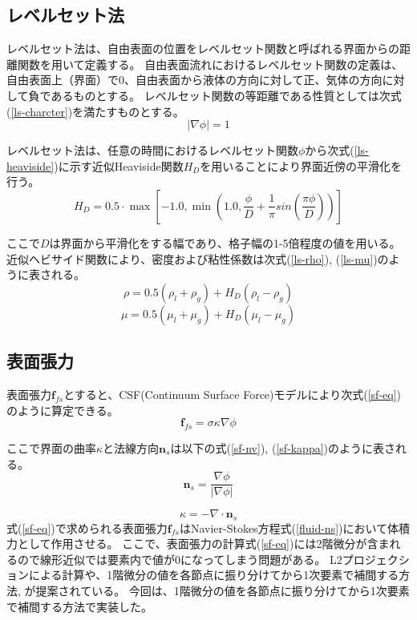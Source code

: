 \subsection{レベルセット法}
レベルセット法は、自由表面の位置をレベルセット関数と呼ばれる界面からの距離関数を用いて定義する。
自由表面流れにおけるレベルセット関数の定義は、自由表面上（界面）で0、自由表面から液体の方向に対して正、気体の方向に対して負であるものとする。
レベルセット関数の等距離である性質としては次式(\ref{ls-charcter})を満たすものとする。
\begin{equation}
\label{ls-charcter}
	| \nabla \phi | = 1
\end{equation}

レベルセット法は、任意の時間におけるレベルセット関数$\phi$から次式(\ref{ls-heaviside})に示す近似Heaviside関数$H_{D}$を用いることにより界面近傍の平滑化を行う。
\begin{equation}
\label{ls-heaviside}
	H_{D} = 0.5 \cdot \max \left[-1.0, \min \left(1.0, \frac{\phi}{D} + \frac{1}{\pi} sin\left(\frac{\pi \phi}{D}\right)\right) \right]
\end{equation}

ここで$D$は界面から平滑化をする幅であり、格子幅の1-5倍程度の値を用いる。
近似ヘビサイド関数により、密度および粘性係数は次式(\ref{ls-rho}), (\ref{ls-mu})のように表される。
\begin{equation}
\label{ls-rho}
	\rho = 0.5 (\rho_l + \rho_g) + H_{D} (\rho_l - \rho_g)
\end{equation}
\begin{equation}
\label{ls-mu}
	\mu = 0.5 (\mu_l + \mu_g) + H_{D} (\mu_l - \mu_g)
\end{equation}


\subsection{表面張力}
表面張力$\bm{f}_{fs}$とすると、CSF(Continuum Surface Force)モデルにより次式(\ref{sf-eq})のように算定できる。
\begin{equation}
\label{sf-eq}
	\bm{f}_{fs} = \sigma \kappa \nabla \phi
\end{equation}

ここで界面の曲率$\kappa$と法線方向$\bm{n}_{s}$は以下の式(\ref{sf-nv}), (\ref{sf-kappa})のように表される。
\begin{equation}
\label{sf-nv}
	\bm{n}_{s} = \frac{\nabla \phi}{| \nabla \phi |}
\end{equation}

\begin{equation}
\label{sf-kappa}
	\kappa = - \nabla \cdot \bm{n}_{s}
\end{equation}
式(\ref{sf-eq})で求められる表面張力$\bm{f}_{fs}$はNavier-Stokes方程式(\ref{fluid-ns})において体積力として作用させる。
ここで、表面張力の計算式(\ref{sf-eq})には2階微分が含まれるので線形近似では要素内で値が0になってしまう問題がある。
L2プロジェクションによる計算\cite{Nagrath2003}や、1階微分の値を各節点に振り分けてから1次要素で補間する方法\cite{Matsumoto2006}, \cite{Shi2019}が提案されている。
今回は、1階微分の値を各節点に振り分けてから1次要素で補間する方法で実装した。

